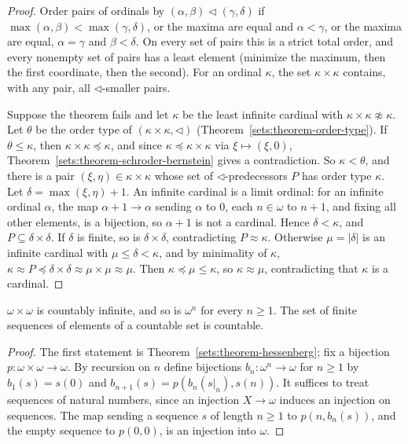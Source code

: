 \begin{proof}
Order pairs of ordinals by $(\alpha, \beta) \lhd (\gamma, \delta)$ if
$\max(\alpha, \beta) < \max(\gamma, \delta)$, or the maxima are equal and
$\alpha < \gamma$, or the maxima are equal, $\alpha = \gamma$ and
$\beta < \delta$. On every set of pairs this is a strict total order, and every
nonempty set of pairs has a least element (minimize the maximum, then the
first coordinate, then the second). For an ordinal $\kappa$, the set
$\kappa \times \kappa$ contains, with any pair, all $\lhd$-smaller pairs.

Suppose the theorem fails and let $\kappa$ be the least infinite cardinal with
$\kappa \times \kappa \not\approx \kappa$. Let $\theta$ be the order type of
$(\kappa \times \kappa, \lhd)$ (Theorem~\ref{sets:theorem-order-type}). If
$\theta \leq \kappa$, then $\kappa \times \kappa \preceq \kappa$, and since
$\kappa \preceq \kappa \times \kappa$ via $\xi \mapsto (\xi, 0)$,
Theorem~\ref{sets:theorem-schroder-bernstein} gives a contradiction. So
$\kappa < \theta$, and there is a pair $(\xi, \eta) \in \kappa \times \kappa$ whose
set of $\lhd$-predecessors $P$ has order type $\kappa$. Let
$\delta = \max(\xi, \eta) + 1$. An infinite cardinal is a limit ordinal: for an
infinite ordinal $\alpha$, the map $\alpha + 1 \to \alpha$ sending $\alpha$ to
$0$, each $n \in \omega$ to $n + 1$, and fixing all other elements, is a
bijection, so $\alpha + 1$ is not a cardinal. Hence $\delta < \kappa$, and
$P \subseteq \delta \times \delta$.
If $\delta$ is finite, so is $\delta \times \delta$, contradicting
$P \approx \kappa$. Otherwise $\mu = |\delta|$ is an infinite cardinal with
$\mu \leq \delta < \kappa$, and by minimality of $\kappa$,
$\kappa \approx P \preceq \delta \times \delta \approx \mu \times \mu \approx \mu$. Then
$\kappa \preceq \mu \leq \kappa$, so $\kappa \approx \mu$, contradicting that $\kappa$
is a cardinal.
\end{proof}

\begin{corollary}\label{sets:corollary-omega-squared}
$\omega \times \omega$ is countably infinite, and so is $\omega^n$ for every
$n \geq 1$. The set of finite sequences of elements of a countable set is
countable.
\end{corollary}

\begin{proof}
The first statement is Theorem~\ref{sets:theorem-hessenberg}; fix a bijection
$p \colon \omega \times \omega \to \omega$. By recursion on $n$ define bijections
$b_n \colon \omega^n \to \omega$ for $n \geq 1$ by $b_1(s) = s(0)$ and
$b_{n+1}(s) = p(b_n(s|_n), s(n))$. It suffices to treat sequences of natural
numbers, since an injection $X \to \omega$ induces an injection on sequences.
The map sending a sequence $s$ of length $n \geq 1$ to $p(n, b_n(s))$, and the
empty sequence to $p(0, 0)$, is an injection into $\omega$.
\end{proof}

